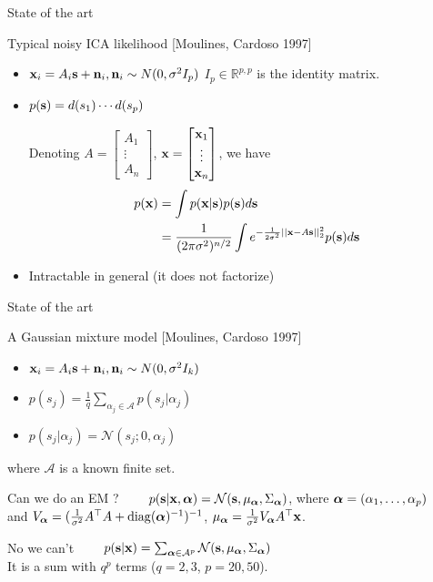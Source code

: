 \documentclass[bigger]{beamer}
\begin{document}
\begin{frame}{State of the art}
  \begin{block}{Typical noisy ICA likelihood [Moulines, Cardoso 1997]}
    \begin{itemize}
    \item $\mathbf{x}_i = A_i \mathbf{s} + \mathbf{n}_i, \mathbf{n}_i \sim N(0, \sigma^2 I_{p})$
      $I_{p} \in \mathbb{R}^{p, p}$ is the identity matrix.
    \item \(p(\mathbf{s}) = d(s_1) \cdots d(s_p)\)
      
      Denoting $A = \begin{bmatrix} A_1 \\ \vdots \\ A_n \end{bmatrix}$, $\mathbf{x} = \begin{bmatrix}
        \mathbf{x}_1 \\ \vdots \\ \mathbf{x}_n \end{bmatrix}$, we have
      \begin{align} p(\mathbf{x}) &= \int p(\mathbf{x}|\mathbf{s})p(\mathbf{s})d\mathbf{s} \\
                           &= \frac{1}{(2\pi \sigma^2)^{n/2}}\int e^{-\frac{1}{2 \sigma^2}||\mathbf{x} - A \mathbf{s}||^2_2}p(\mathbf{s})d\mathbf{s}
      \end{align}
    \item Intractable in general (it does not factorize)
    \end{itemize}
  \end{block}
\end{frame}

\begin{frame}{State of the art}
  \begin{block}{A Gaussian mixture model [Moulines, Cardoso 1997]}
    \begin{itemize}
    \item $\mathbf{x}_i = A_i\mathbf{s} + \mathbf{n}_i, \mathbf{n}_i \sim N(0, \sigma^2 I_{k})$
     \item $p(s_j) = \frac1q \sum_{\alpha_j \in \mathcal{A}} p(s_j | \alpha_j)$
     \item $p(s_j | \alpha_j) = \mathcal{N}( s_j; 0, \alpha_j)$
    \end{itemize}
    where $\mathcal{A}$ is a known finite set.
  \end{block}
  \pause
  \begin{block}{Can we do an EM ?}
      $ \enspace \enspace \enspace \enspace p(\mathbf{s} | \mathbf{x}, \bm{\alpha}) =  \mathcal{N}(\mathbf{s}, \mu_{\bm{\alpha}}, \Sigma_{\bm{\alpha}})$,
      where $\bm{\alpha} = (\alpha_1, \dots, \alpha_p)$ \\
    and $V_{\bm{\alpha}} = (\frac1{\sigma^2}A^{\top}A + {\rm diag}(\bm{\alpha})^{-1})^{-1}$, $\mu_{\bm{\alpha}} = \frac1{\sigma^2}V_{\bm{\alpha}} A^{\top} \mathbf{x}$.
  \end{block}
  \pause
  \begin{block}{No we can't}
      $\enspace \enspace \enspace \enspace  p(\mathbf{s} | \mathbf{x}) =  \sum_{\bm{\alpha} \in \mathcal{A}^p} \mathcal{N}(\mathbf{s},
      \mu_{\bm{\alpha}}, \Sigma_{\bm{\alpha}})$ \\
    It is a sum with $q^p$ terms ($q=2, 3$, $p=20, 50$).
  \end{block}
  
\end{frame}
\end{document}

